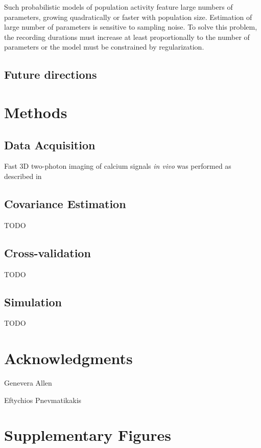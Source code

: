 \documentclass[10pt]{article}
\begin{document}
Such probabilistic models of population activity feature large numbers of parameters, growing quadratically or faster with population size. Estimation of large number of parameters is sensitive to sampling noise. To solve this problem, the recording durations must increase at least proportionally to the number of parameters or the model must be constrained by regularization. 

\subsection*{Future directions}

\section*{Methods}
\subsection*{Data Acquisition}
Fast 3D two-photon imaging of calcium signals \emph{in vivo} was performed as described in \cite{Cotton:2013}
\subsection*{Covariance Estimation}
TODO
\subsection*{Cross-validation}
TODO
\subsection*{Simulation}
TODO

\section*{Acknowledgments}
Genevera Allen

Eftychios Pnevmatikakis 




\section*{Supplementary Figures}
\end{document}
